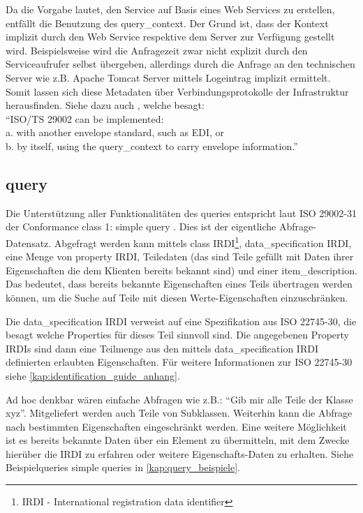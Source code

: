 Da die Vorgabe lautet, den Service auf Basis eines Web Services zu erstellen, entfällt die Benutzung des query\_context. Der Grund ist, dass der Kontext  implizit durch den Web Service respektive dem Server zur Verfügung gestellt wird. Beispielsweise wird die Anfragezeit zwar nicht explizit durch den Serviceaufrufer selbst übergeben, allerdings durch die Anfrage an den technischen Server wie z.B. Apache Tomcat Server mittels Logeintrag implizit ermittelt. Somit lassen sich diese Metadaten über Verbindungsprotokolle der Infrastruktur herausfinden.  
Siehe dazu auch \citep[Kap. 6][]{iso29002-31}, welche besagt: \\ \enquote{ISO/TS 29002 can be implemented: \\
a. with another envelope standard, such as EDI, or \\
b. by itself, using the query\_context to carry envelope information.}

\subsection{query}\label{sec:query}
Die Unterstützung aller Funktionalitäten des queries entspricht laut ISO 29002-31 der Conformance class 1: simple query \citep[Anhang 6][]{iso29002-31}.
Dies ist der eigentliche Abfrage-Datensatz. Abgefragt werden kann mittels class IRDI\footnote{IRDI  - International registration data identifier}, data\_specification IRDI, eine Menge von property IRDI, Teiledaten (das sind Teile gefüllt mit Daten ihrer Eigenschaften die dem Klienten bereits bekannt sind) und einer item\_description. Das bedeutet, dass bereits bekannte Eigenschaften eines Teils übertragen werden können, um die Suche auf Teile mit diesen Werte-Eigenschaften einzuschränken.

Die data\_specification IRDI verweist auf eine Spezifikation aus ISO 22745-30, die besagt welche Properties für dieses Teil sinnvoll sind. Die angegebenen Property IRDIs sind dann eine Teilmenge aus den mittels data\_specification IRDI definierten erlaubten Eigenschaften. Für weitere Informationen zur ISO 22745-30 siehe \autoref{kap:identification_guide_anhang}. 

Ad hoc denkbar wären einfache Abfragen wie z.B.: \enquote{Gib mir alle Teile der Klasse xyz}. Mitgeliefert werden auch Teile von Subklassen. Weiterhin kann die Abfrage nach bestimmten Eigenschaften eingeschränkt werden. Eine weitere Möglichkeit ist es bereits bekannte Daten über ein Element zu übermitteln, mit dem Zwecke hierüber die IRDI zu erfahren oder weitere Eigenschafts-Daten zu erhalten. Siehe Beispielqueries simple queries in \autoref{kap:query_beispiele}. 

